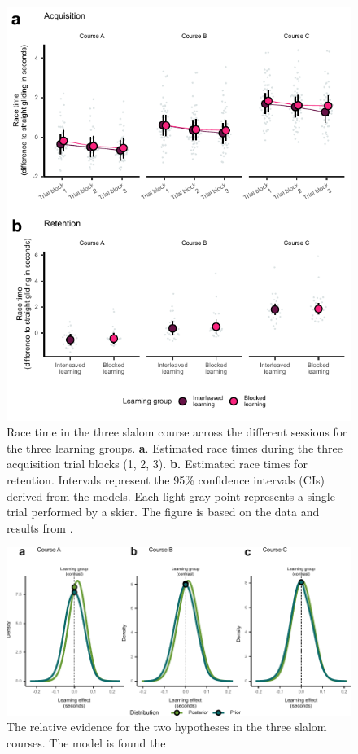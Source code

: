 \begin{figure}
    \centering
    \includegraphics[width=1\linewidth]{figure/figure_results_ci_acquisitionandretention_2.pdf}
    \caption[Short version for LoF]{Race time in the three slalom course across the different sessions for the three learning groups. \textbf{a}. Estimated race times during the three acquisition trial blocks (1, 2, 3). \textbf{b.} Estimated race times for retention. Intervals represent the 95\% confidence intervals (CIs) derived from the models. Each light gray point represents a single trial performed by a skier. The figure is based on the data and results from \cite{magelssen_is_2022}.}
    \label{fig:ci_results}
\end{figure}

\begin{figure}
    \centering
    \includegraphics[width=1\linewidth]{figure/figure_results_BF_3.pdf}
    \caption{The relative evidence for the two hypotheses in the three slalom courses. The model is found the }
    \label{fig:ci_bf}
\end{figure}

